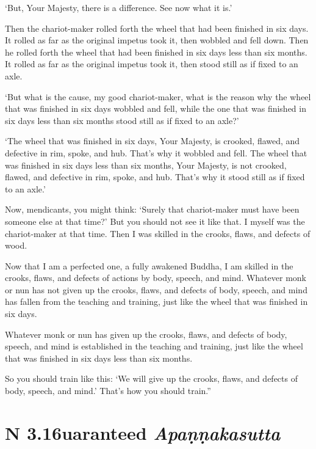 \documentclass[12pt,openany]{book}%
\newcommand*{\suttatitleacronym}[1]{\smaller[2]{#1}\vspace*{.3em}}
\newcommand*{\suttatitletranslation}[1]{\linebreak{#1}}
\newcommand*{\suttatitleroot}[1]{\linebreak\smaller[2]\itshape{#1}}
\newcommand*{\tocacronym}[1]{\hspace*{-3.3em}{#1}\quad}
\newcommand*{\toctranslation}[1]{#1}
\newcommand*{\tocroot}[1]{(\textit{#1})}
\begin{document}
‘But, Your Majesty, there is a difference. See now what it is.’ 

Then the chariot-maker rolled forth the wheel that had been finished in six days. It rolled as far as the original impetus took it, then wobbled and fell down. Then he rolled forth the wheel that had been finished in six days less than six months. It rolled as far as the original impetus took it, then stood still as if fixed to an axle. 

‘But what is the cause, my good chariot-maker, what is the reason why the wheel that was finished in six days wobbled and fell, while the one that was finished in six days less than six months stood still as if fixed to an axle?’ 

‘The wheel that was finished in six days, Your Majesty, is crooked, flawed, and defective in rim, spoke, and hub. That’s why it wobbled and fell. The wheel that was finished in six days less than six months, Your Majesty, is not crooked, flawed, and defective in rim, spoke, and hub. That’s why it stood still as if fixed to an axle.’ 

Now, mendicants, you might think: ‘Surely that chariot-maker must have been someone else at that time?’ But you should not see it like that. I myself was the chariot-maker at that time. Then I was skilled in the crooks, flaws, and defects of wood. 

Now that I am a perfected one, a fully awakened Buddha, I am skilled in the crooks, flaws, and defects of actions by body, speech, and mind. Whatever monk or nun has not given up the crooks, flaws, and defects of body, speech, and mind has fallen from the teaching and training, just like the wheel that was finished in six days. 

Whatever monk or nun has given up the crooks, flaws, and defects of body, speech, and mind is established in the teaching and training, just like the wheel that was finished in six days less than six months. 

So you should train like this: ‘We will give up the crooks, flaws, and defects of body, speech, and mind.’ That’s how you should train.” 

%
\section*{{\suttatitleacronym AN 3.16}{\suttatitletranslation Guaranteed }{\suttatitleroot Apaṇṇakasutta}}
\addcontentsline{toc}{section}{\tocacronym{AN 3.16} \toctranslation{Guaranteed } \tocroot{Apaṇṇakasutta}}
\end{document}
